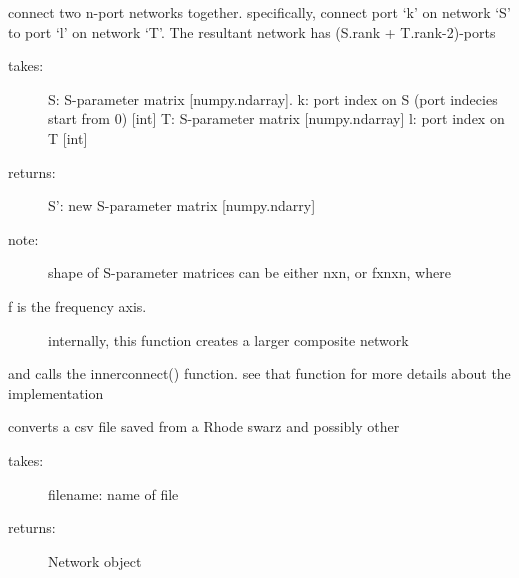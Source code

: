 \documentclass[letterpaper,10pt,english]{sphinxmanual}
\begin{document}

\begin{fulllineitems}
\label{api/mwavepy:mwavepy.network.connect_s}
connect two n-port networks together. specifically, connect port `k'
on network `S' to port `l' on network `T'. The resultant network has
(S.rank + T.rank-2)-ports
\begin{description}
\item[{takes:}] \leavevmode
S: S-parameter matrix {[}numpy.ndarray{]}.
k: port index on S (port indecies start from 0) {[}int{]}
T: S-parameter matrix {[}numpy.ndarray{]}
l: port index on T {[}int{]}

\item[{returns:}] \leavevmode
S': new S-parameter matrix {[}numpy.ndarry{]}

\item[{note: }] \leavevmode
shape of S-parameter matrices can be either nxn, or fxnxn, where

\item[{f is the frequency axis. }] \leavevmode
internally, this function creates a larger composite network

\end{description}

and calls the  innerconnect() function. see that function for more 
details about the implementation

\end{fulllineitems}


\begin{fulllineitems}
\label{api/mwavepy:mwavepy.network.csv_2_touchstone}
converts a csv file saved from a Rhode swarz and possibly other
\begin{description}
\item[{takes:}] \leavevmode
filename: name of file

\item[{returns:}] \leavevmode
Network object

\end{description}

\end{fulllineitems}

\end{document}
